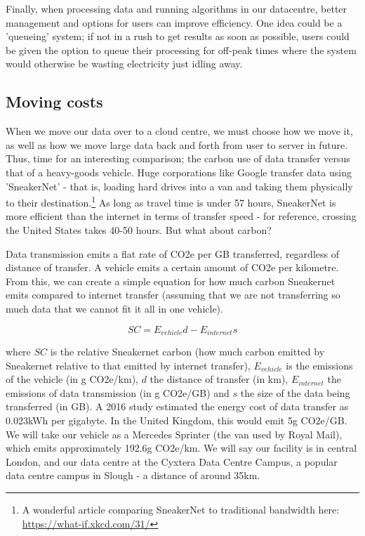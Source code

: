 \documentclass{article}
\begin{document}
Finally, when processing data and running algorithms in our datacentre, better management and options for users can improve efficiency. One idea could be a 'queueing' system; if not in a rush to get results as soon as possible, users could be given the option to queue their processing for off-peak times where the system would otherwise be wasting electricity just idling away.


\subsection{Moving costs}
When we move our data over to a cloud centre, we must choose how we move it, as well as how we move large data back and forth from user to server in future. Thus, time for an interesting comparison; the carbon use of data transfer versus that of a heavy-goods vehicle. Huge corporations like Google transfer data using 'SneakerNet' - that is, loading hard drives into a van and taking them physically to their destination.\footnote{A wonderful article comparing SneakerNet to traditional bandwidth here: \href{https://what-if.xkcd.com/31/}{https://what-if.xkcd.com/31/}} As long as travel time is under 57 hours, SneakerNet is more efficient than the internet in terms of transfer speed \citep{jaya2020sneakernet} - for reference, crossing the United States takes 40-50 hours. But what about carbon? \newline

Data transmission emits a flat rate of CO2e per GB transferred, regardless of distance of transfer. A vehicle emits a certain amount of CO2e per kilometre. From this, we can create a simple equation for how much carbon Sneakernet emits compared to internet transfer (assuming that we are not transferring so much data that we cannot fit it all in one vehicle).

$$SC = E_{vehicle}d - E_{internet}s$$

where $SC$ is the relative Sneakernet carbon (how much carbon emitted by Sneakernet relative to that emitted by internet transfer), $E_{vehicle}$ is the emissions of the vehicle (in g CO2e/km), $d$ the distance of transfer (in km), $E_{internet}$ the emissions of data transmission (in g CO2e/GB) and $s$ the size of the data being transferred (in GB). A 2016 study estimated the energy cost of data transfer as 0.023kWh per gigabyte. \citep{aslan2018electricity} In the United Kingdom, this would emit 5g CO2e/GB. We will take our vehicle as a Mercedes Sprinter (the van used by Royal Mail), which emits approximately 192.6g CO2e/km. \citep{mercedes2019sprinter} We will say our facility is in central London, and our data centre at the Cyxtera Data Centre Campus, a popular data centre campus in Slough - a distance of around 35km. \newline
\end{document}
